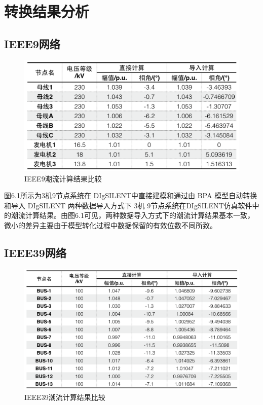 \chapter{转换结果分析}

\section{IEEE9网络}

\begin{figure}[H]
\centering
\includegraphics[width=1.05\textwidth]{images/Paper_Fig_55.png}
\setcaptionwidth{\linewidth}
\caption{IEEE9潮流计算结果比较}
\end{figure}

图6.1所示为3机9节点系统在 DIgSILENT中直接建模和通过由 BPA 模型自动转换和导入 DIgSILENT 两种数据导入方式下 3机 9节点系统在DIgSILENT仿真软件中的潮流计算结果。由图6.1可见，两种数据导入方式下的潮流计算结果基本一致，微小的差异主要由于模型转化过程中数据保留的有效位数不同所致。

\section{IEEE39网络}

\begin{figure}[H]
\centering
\includegraphics[width=1.0\textwidth]{images/Paper_Fig_56.png}
\setcaptionwidth{\linewidth}
\caption{IEEE39潮流计算结果比较}
\end{figure}

